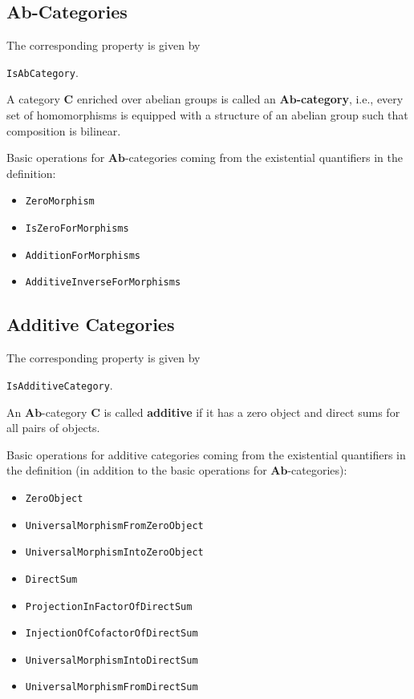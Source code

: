 \subsection{Ab-Categories}

\begin{documentation}
 The corresponding \GAP property is given by
 \begin{center}
  \texttt{IsAbCategory}.  
 \end{center}
\end{documentation}

\begin{definition}
 A category $\mathbf{C}$ enriched over abelian groups is called an \textbf{$\mathbf{Ab}$-category}, i.e.,
 every set of homomorphisms is equipped with a structure of an abelian group
 such that composition is bilinear.
\end{definition}

Basic operations for $\mathbf{Ab}$-categories coming from the existential quantifiers
in the definition:
\begin{itemize}
 \item \texttt{ZeroMorphism}
 \item \texttt{IsZeroForMorphisms}
 \item \texttt{AdditionForMorphisms}
 \item \texttt{AdditiveInverseForMorphisms}
\end{itemize}

\subsection{Additive Categories}

\begin{documentation}
 The corresponding \GAP property is given by
 \begin{center}
  \texttt{IsAdditiveCategory}.  
 \end{center}
\end{documentation}

\begin{definition}
 An $\mathbf{Ab}$-category $\mathbf{C}$ is called \textbf{additive}
 if it has a zero object and direct sums for all pairs of objects.
\end{definition}

Basic operations for additive categories coming from the existential quantifiers
in the definition
(in addition to the basic operations for $\mathbf{Ab}$-categories):
\begin{itemize}
 \item \texttt{ZeroObject}
 \item \texttt{UniversalMorphismFromZeroObject}
 \item \texttt{UniversalMorphismIntoZeroObject}
 \item \texttt{DirectSum}
 \item \texttt{ProjectionInFactorOfDirectSum}
 \item \texttt{InjectionOfCofactorOfDirectSum}
 \item \texttt{UniversalMorphismIntoDirectSum}
 \item \texttt{UniversalMorphismFromDirectSum}
\end{itemize}


